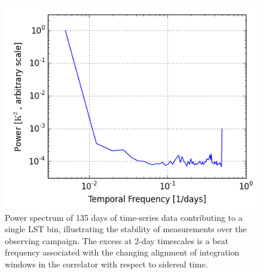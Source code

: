 \documentclass[twocolumn,numberedappendix]{emulateapj} \shorttitle{PSA64}
\begin{document}
\begin{figure}[!t]
\centering
\includegraphics[width=\columnwidth]{plots/stability.png}
\caption{Power spectrum of 135 days of time-series data contributing to a single LST bin,
illustrating the stability of measurements over the observing campaign.  The excess at
2-day timescales is a beat frequency associated with the changing alignment of 
integration windows in the correlator with respect to sidereal time.  
}\label{fig:stability}
\end{figure}
\end{document}

